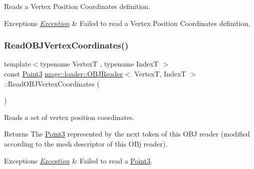 Reads a Vertex Position Coordinates definition.


\begin{DoxyExceptions}{Exceptions}
{\em \hyperlink{classmage_1_1_exception}{Exception}} & Failed to read a Vertex Position Coordinates definition. \\
\hline
\end{DoxyExceptions}
\hypertarget{classmage_1_1loader_1_1_o_b_j_reader_a0764ffe56593a84cf4a7613e0a61ed50}{}\label{classmage_1_1loader_1_1_o_b_j_reader_a0764ffe56593a84cf4a7613e0a61ed50} 
\subsubsection{\texorpdfstring{Read\+O\+B\+J\+Vertex\+Coordinates()}{ReadOBJVertexCoordinates()}}
{\footnotesize\ttfamily template$<$typename VertexT , typename IndexT $>$ \\
const \hyperlink{structmage_1_1_point3}{Point3} \hyperlink{classmage_1_1loader_1_1_o_b_j_reader}{mage\+::loader\+::\+O\+B\+J\+Reader}$<$ VertexT, IndexT $>$\+::Read\+O\+B\+J\+Vertex\+Coordinates (\begin{DoxyParamCaption}{ }\end{DoxyParamCaption})\hspace{0.3cm}{\ttfamily [private]}}

Reads a set of vertex position coordinates.

\begin{DoxyReturn}{Returns}
The {\ttfamily \hyperlink{structmage_1_1_point3}{Point3}} represented by the next token of this O\+BJ reader (modified according to the mesh descriptor of this O\+Bj reader). 
\end{DoxyReturn}

\begin{DoxyExceptions}{Exceptions}
{\em \hyperlink{classmage_1_1_exception}{Exception}} & Failed to read a {\ttfamily \hyperlink{structmage_1_1_point3}{Point3}}. \\
\hline
\end{DoxyExceptions}
\hypertarget{classmage_1_1loader_1_1_o_b_j_reader_a0647bb9573512a480125744c0f100618}{}\label{classmage_1_1loader_1_1_o_b_j_reader_a0647bb9573512a480125744c0f100618} 
